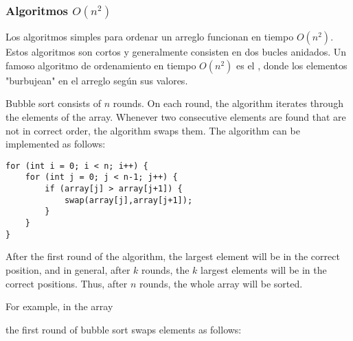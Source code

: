 \subsubsection{Algoritmos $O(n^2)$}


Los algoritmos simples para ordenar un arreglo
funcionan en tiempo $O(n^2)$.
Estos algoritmos son cortos y generalmente
consisten en dos bucles anidados.
Un famoso algoritmo de ordenamiento en tiempo $O(n^2)$
es el , donde los elementos
"burbujean" en el arreglo según sus valores.

Bubble sort consists of $n$ rounds.
On each round, the algorithm iterates through
the elements of the array.
Whenever two consecutive elements are found
that are not in correct order,
the algorithm swaps them.
The algorithm can be implemented as follows:
\begin{lstlisting}
for (int i = 0; i < n; i++) {
    for (int j = 0; j < n-1; j++) {
        if (array[j] > array[j+1]) {
            swap(array[j],array[j+1]);
        }
    }
}
\end{lstlisting}

After the first round of the algorithm,
the largest element will be in the correct position,
and in general, after $k$ rounds, the $k$ largest
elements will be in the correct positions.
Thus, after $n$ rounds, the whole array
will be sorted.

For example, in the array

\begin{center}
\end{center}

\noindent
the first round of bubble sort swaps elements
as follows:

\begin{center}
\end{center}

